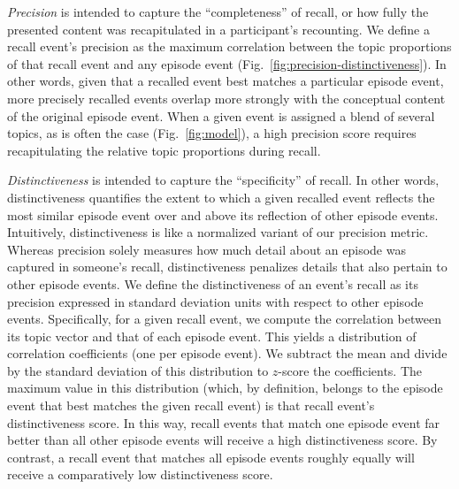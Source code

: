 \documentclass[10pt]{article}
\begin{document}
\textit{Precision} is intended to capture the ``completeness'' of recall, or how fully the presented content was recapitulated in a participant's recounting.  We define a recall event's precision as the maximum correlation between the topic proportions of that recall event and any episode event (Fig.~\ref{fig:precision-distinctiveness}).  In other words, given that a recalled event best matches a particular episode event, more precisely recalled events overlap more strongly with the conceptual content of the original episode event.  When a given event is assigned a blend of several topics, as is often the case (Fig.~\ref{fig:model}), a high precision score requires recapitulating the relative topic proportions during recall.

\textit{Distinctiveness} is intended to capture the ``specificity'' of recall.  In other words, distinctiveness quantifies the extent to which a given recalled event reflects the most similar episode event over and above its reflection of other episode events.  Intuitively, distinctiveness is like a normalized variant of our precision metric.  Whereas precision solely measures how much detail about an episode was captured in someone's recall, distinctiveness penalizes details that also pertain to other episode events.  We define the distinctiveness of an event's recall as its precision expressed in standard deviation units with respect to other episode events.  Specifically, for a given recall event, we compute the correlation between its topic vector and that of each episode event.  This yields a distribution of correlation coefficients (one per episode event).  We subtract the mean and divide by the standard deviation of this distribution to $z$-score the coefficients.  The maximum value in this distribution (which, by definition, belongs to the episode event that best matches the given recall event) is that recall event's distinctiveness score.  In this way, recall events that match one episode event far better than all other episode events will receive a high distinctiveness score.  By contrast, a recall event that matches all episode events roughly equally will receive a comparatively low distinctiveness score.
\end{document}
